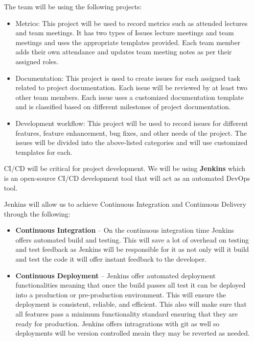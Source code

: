\documentclass{article}
\begin{document}
The team will be using the following projects:

\begin{itemize}
\item Metrics: This project will be used to record metrics such as attended lectures and team meetings. It has two types of Issues lecture meetings and team meetings and uses the appropriate templates provided. Each team member adds their own attendance and updates team meeting notes as per their assigned roles.
\item Documentation: This project is used to create issues for each assigned task related to project documentation. Each issue will be reviewed by at least two other team members. Each issue uses a customized documentation template and is classified based on different milestones of project documentation. 
\item Development workflow: This project will be used to record issues for different features, feature enhancement, bug fixes, and other needs of the project. The issues will be divided into the above-listed categories and will use customized templates for each. 
\end{itemize}

CI/CD will be critical for project development. We will be using \textbf{Jenkins} which is an open-source CI/CD development tool that will act as an automated DevOps tool.

Jenkins will allow us to achieve Continuous Integration and Continuous Delivery through the following:
\begin{itemize}
  \item \textbf{Continuous Integration} -- On the continuous integration time Jenkins offers automated build and testing. This will save a lot of overhead on testing and test feedback as Jenkins will be responsible for it as not only will it build and test the code it will offer instant feedback to the developer.
  \item \textbf{Continuous Deployment} -- Jenkins offer automated deployment functionalities meaning that once the build passes all test it can be deployed into a production or pre-production environment. This will ensure the deployment is consistent, reliable, and efficient. This also will make sure that all features pass a minimum functionality standard ensuring that they are ready for production. Jenkins offers intragrations with git as well so deployments will be version controlled meain they may be reverted as needed.
\end{itemize}
\end{document}
